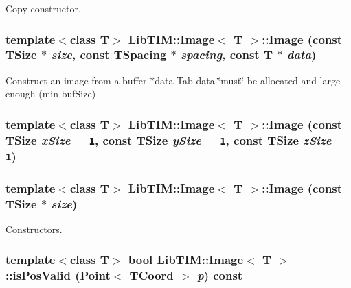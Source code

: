 Copy constructor. 

\subsubsection{\setlength{\rightskip}{0pt plus 5cm}template$<$class T$>$ {\bf Lib\-TIM::Image}$<$ T $>$::Image (const {\bf TSize} $\ast$ {\em size}, const {\bf TSpacing} $\ast$ {\em spacing}, const T $\ast$ {\em data})\hspace{0.3cm}{\tt  [inherited]}}\label{group__Image_ga13}


Construct an image from a buffer $\ast$data Tab data \char`\"{}must\char`\"{} be allocated and large enough (min buf\-Size) 
\subsubsection{\setlength{\rightskip}{0pt plus 5cm}template$<$class T$>$ {\bf Lib\-TIM::Image}$<$ T $>$::Image (const {\bf TSize} {\em x\-Size} = {\tt 1}, const {\bf TSize} {\em y\-Size} = {\tt 1}, const {\bf TSize} {\em z\-Size} = {\tt 1})\hspace{0.3cm}{\tt  [inherited]}}\label{group__Image_ga12}


\subsubsection{\setlength{\rightskip}{0pt plus 5cm}template$<$class T$>$ {\bf Lib\-TIM::Image}$<$ T $>$::Image (const {\bf TSize} $\ast$ {\em size})\hspace{0.3cm}{\tt  [inherited]}}\label{group__Image_ga11}


Constructors. 

\subsubsection{\setlength{\rightskip}{0pt plus 5cm}template$<$class T$>$ bool {\bf Lib\-TIM::Image}$<$ T $>$::is\-Pos\-Valid ({\bf Point}$<$ {\bf TCoord} $>$ {\em p}) const\hspace{0.3cm}{\tt  [inline, inherited]}}\label{group__Image_ga70}


